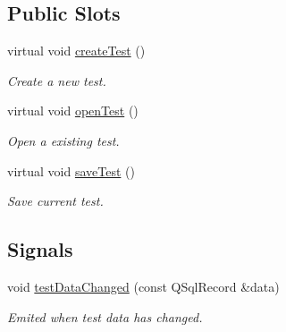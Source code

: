 \subsection*{Public Slots}
\begin{DoxyCompactItemize}
\item 
virtual void \hyperlink{classmdt_tt_abstract_tester_aab3ece519008d5553528aa041875fa2b}{create\-Test} ()
\begin{DoxyCompactList}\small\item\em Create a new test. \end{DoxyCompactList}\item 
virtual void \hyperlink{classmdt_tt_abstract_tester_a6eaa05aeaa2fd8d77c1fbfe7eb06cec6}{open\-Test} ()
\begin{DoxyCompactList}\small\item\em Open a existing test. \end{DoxyCompactList}\item 
virtual void \hyperlink{classmdt_tt_abstract_tester_a36fe4f0ba9940455a975538f89660327}{save\-Test} ()
\begin{DoxyCompactList}\small\item\em Save current test. \end{DoxyCompactList}\end{DoxyCompactItemize}
\subsection*{Signals}
\begin{DoxyCompactItemize}
\item 
void \hyperlink{classmdt_tt_abstract_tester_af7aaec93927106040b137fa92a597d1b}{test\-Data\-Changed} (const Q\-Sql\-Record \&data)
\begin{DoxyCompactList}\small\item\em Emited when test data has changed. \end{DoxyCompactList}\end{DoxyCompactItemize}
